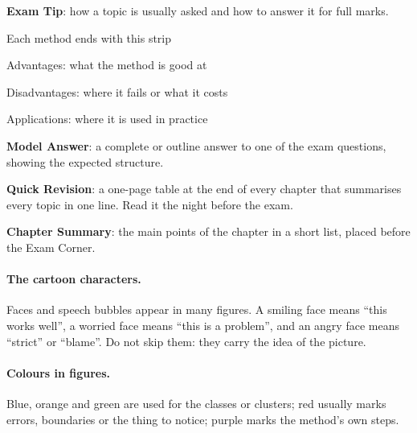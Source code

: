 \begin{exam}
\textbf{Exam Tip}: how a topic is usually asked and how to answer it for full marks.
\end{exam}

{\item Each method ends with this strip
 \item Advantages: what the method is good at}
{\item Disadvantages: where it fails or what it costs}
{\item Applications: where it is used in practice}

\begin{modelans}[: example]
\textbf{Model Answer}: a complete or outline answer to one of the exam questions, showing the expected structure.
\end{modelans}

\begin{revision}
\textbf{Quick Revision}: a one-page table at the end of every chapter that summarises every topic in one line. Read it the night before the exam.
\end{revision}

\begin{summary}
\textbf{Chapter Summary}: the main points of the chapter in a short list, placed before the Exam Corner.
\end{summary}

\paragraph{The cartoon characters.} Faces and speech bubbles appear in many figures. A smiling face means ``this works well'', a worried face means ``this is a problem'', and an angry face means ``strict'' or ``blame''. Do not skip them: they carry the idea of the picture.

\paragraph{Colours in figures.} Blue, orange and green are used for the classes or clusters; red usually marks errors, boundaries or the thing to notice; purple marks the method's own steps.
